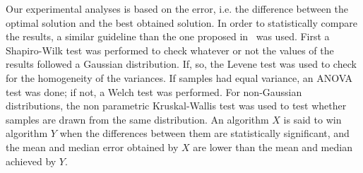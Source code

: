 Our experimental analyses is based on the error, i.e. the difference between the optimal solution and the best obtained solution.
%
In order to statistically compare the results, a similar guideline than the one proposed in~\cite{Joel:StatisticalTest} was used. 
%
First a Shapiro-Wilk test was performed to check whatever or not the values of the results followed a Gaussian distribution. 
%
If, so, the Levene test was used to check for the homogeneity of the variances. 
%
If samples had equal variance, an ANOVA test was done; if not, a Welch test was performed. 
%
For non-Gaussian distributions, the non parametric Kruskal-Wallis test was used to test whether samples are drawn from the same distribution. 
%
An algorithm $X$ is said to win algorithm $Y$ when the differences between them are statistically significant, and the mean and median error obtained by $X$ are lower 
than the mean and median achieved by $Y$.

